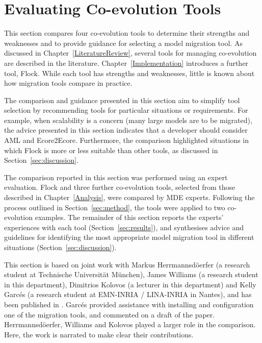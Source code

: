 
\section{Evaluating Co-evolution Tools}
\label{sec:collaborative_comparison}
This section compares four co-evolution tools to determine their strengths and weaknesses and to provide guidance for selecting a model migration tool. 
As discussed in Chapter~\ref{LiteratureReview}, several tools for managing co-evolution are described in the literature. Chapter~\ref{Implementation} introduces a further tool, Flock. While each tool has strengths and weaknesses, little is known about how migration tools compare in practice.

The comparison and guidance presented in this section aim to simplify tool selection by recommending tools for particular situations or requirements. For example, when scalability is a concern (many large models are to be migrated), the advice presented in this section indicates that a developer should consider AML and Ecore2Ecore. Furthermore, the comparison highlighted situations in which Flock is more or less suitable than other tools, as discussed in Section~\ref{sec:discussion}.

The comparison reported in this section was performed using an expert evaluation. Flock and three further co-evolution tools, selected from those described in Chapter~\ref{Analysis}, were compared by MDE experts. Following the process outlined in Section~\ref{sec:method}, the tools were applied to two co-evolution examples. The remainder of this section reports the experts' experiences with each tool (Section~\ref{sec:results}), and synthesises advice and guidelines for identifying the most appropriate model migration tool in different situations (Section~\ref{sec:discussion}).

\begin{framed}
This section is based on joint work with Markus Herrmannsd\"{o}erfer (a research student at Technische Universit\"at M\"unchen), James Williams (a research student in this department), Dimitrios Kolovos (a lecturer in this department) and Kelly Garc\'{e}s (a research student at EMN-INRIA / LINA-INRIA in Nantes), and has been published in \cite{rose10comparison}. Garc\'{e}s provided assistance with installing and configuration one of the migration tools, and commented on a draft of the paper. Herrmannsd\"{o}erfer, Williams and Kolovos played a larger role in the comparison. Here, the work is narrated to make clear their contributions.
\end{framed}

